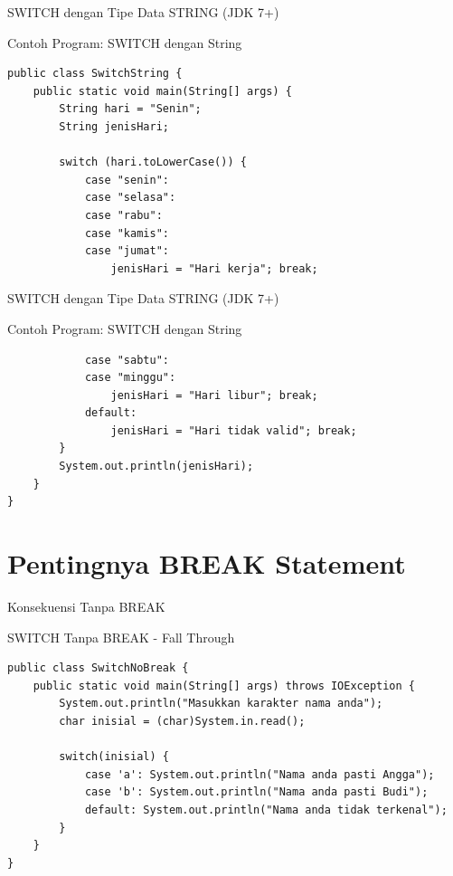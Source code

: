 \documentclass{beamer}
\begin{document}
\begin{frame}[fragile]{SWITCH dengan Tipe Data STRING (JDK 7+)}
  \begin{exampleblock}{Contoh Program: SWITCH dengan String}
    \begin{lstlisting}
public class SwitchString {
    public static void main(String[] args) {
        String hari = "Senin";
        String jenisHari;
        
        switch (hari.toLowerCase()) {
            case "senin": 
            case "selasa": 
            case "rabu": 
            case "kamis": 
            case "jumat": 
                jenisHari = "Hari kerja"; break;
    \end{lstlisting}
  \end{exampleblock}
\end{frame}


\begin{frame}[fragile]{SWITCH dengan Tipe Data STRING (JDK 7+)}
  \begin{exampleblock}{Contoh Program: SWITCH dengan String}
    \begin{lstlisting}
            case "sabtu": 
            case "minggu": 
                jenisHari = "Hari libur"; break;
            default: 
                jenisHari = "Hari tidak valid"; break;
        }
        System.out.println(jenisHari);
    }
}
    \end{lstlisting}
  \end{exampleblock}
\end{frame}

\section{Pentingnya BREAK Statement}
\begin{frame}[fragile]{Konsekuensi Tanpa BREAK}
  \begin{block}{SWITCH Tanpa BREAK - Fall Through}
    \begin{lstlisting}
public class SwitchNoBreak {
    public static void main(String[] args) throws IOException {
        System.out.println("Masukkan karakter nama anda");
        char inisial = (char)System.in.read();
        
        switch(inisial) {
            case 'a': System.out.println("Nama anda pasti Angga");
            case 'b': System.out.println("Nama anda pasti Budi");
            default: System.out.println("Nama anda tidak terkenal");
        }
    }
}
    \end{lstlisting}
  \end{block}
\end{frame}
\end{document}

